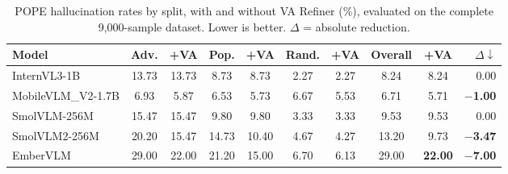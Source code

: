 \documentclass[runningheads]{llncs}
\begin{document}
\begin{table}[ht]
\centering
\caption{POPE hallucination rates by split, with and without VA Refiner (\%), evaluated on the complete 9,000-sample dataset. Lower is better. $\Delta$ = absolute reduction.}
\label{tab:pope}
\scriptsize
\setlength{\tabcolsep}{3pt}
\begin{tabular}{lcc|cc|cc|cc|r}
\toprule
Model & Adv. & +VA & Pop. & +VA & Rand. & +VA & Overall & +VA & $\Delta\downarrow$ \\
\midrule
InternVL3-1B       & 13.73 & 13.73 &  8.73 &  8.73 & 2.27 & 2.27 &  8.24 &  8.24 & 0.00 \\
MobileVLM\_V2-1.7B &  6.93 &  5.87 &  6.53 &  5.73 & 6.67 & 5.53 &  6.71 &  5.71 & \textbf{$-$1.00} \\
SmolVLM-256M       & 15.47 & 15.47 &  9.80 &  9.80 & 3.33 & 3.33 &  9.53 &  9.53 & 0.00 \\
SmolVLM2-256M      & 20.20 & 15.47 & 14.73 & 10.40 & 4.67 & 4.27 & 13.20 &  9.73 & \textbf{$-$3.47} \\
EmberVLM           & 29.00 & 22.00 & 21.20 & 15.00 & 6.70 & 6.13 & 29.00 & \textbf{22.00} & \textbf{$-$7.00} \\
\bottomrule
\end{tabular}
\end{table}
\end{document}
